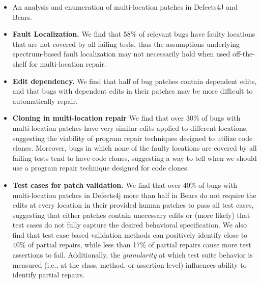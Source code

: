 \documentclass[sigconf, timestamp-false, anonymous=true]{acmart}
\begin{document}
\begin{itemize}
\item An analysis and enumeration of multi-location patches in Defects4J and Bears.
\item \textbf{Fault Localization.}  We find that 58\% of relevant bugs have faulty locations that are not
  covered by all failing tests, thus the assumptions underlying spectrum-based
  fault localization may not necessarily hold when used off-the-shelf for
  multi-location repair.
\item \textbf{Edit dependency.} We 
find that half of bug patches contain dependent edits, and that bugs with dependent 
edits in their patches may be more difficult to automatically repair.
\item \textbf{Cloning in multi-location repair} We find that over 30\% of bugs with multi-location
patches have very similar edits applied to different locations, suggesting the viability of 
program repair techniques designed to utilize code clones. Moreover, bugs in which 
none of the faulty locations are covered by all failing tests tend to have code clones, 
suggesting a way to tell when we should use a program repair technique designed for code 
clones.
\item \textbf{Test cases for patch validation.} We find that over 40\% of bugs with multi-location
  patches in Defects4j more than half in Bears do not require the edits at every
  location in their provided human patches to pass all test cases, suggesting
  that either patches contain unecessary edits or (more likely) that test cases
  do not fully capture the desired behavioral specification.  We also find that test 
  case based validation methods can positively identify close to 40\% of partial repairs,
  while less than
  17\% of partial repairs cause more test assertions to fail. Additionally, the 
  \emph{granularity} at which test suite behavior is measured (i.e., at the class,
  method, or assertion level) influences ability to identify partial
  repairs. 
\end{itemize}

\end{document}
